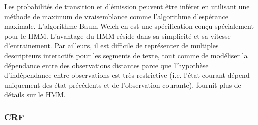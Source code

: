 Les probabilités de transition et d'émission peuvent être inférer en utilisant une méthode de maximum de vraisemblance comme l'algorithme d'espérance maximale. L'algorithme Baum-Welch \citep{welch2003baumwelch} en est une spécification conçu spécialement pour le HMM. L'avantage du HMM réside dans sa simplicité et sa vitesse d'entrainement. Par ailleurs, il est difficile de représenter de multiples descripteurs interactifs pour les segments de texte, tout comme de modéliser la dépendance entre des observations distantes parce que l'hypothèse d'indépendance entre observations est très restrictive (i.e. l'état courant dépend uniquement des état précédents et de l'observation courante). \citet{rabiner1989tutorial} fournit plus de détails sur le HMM.

\subsubsection{CRF}
\label{sec:structuration:biblio:CRF}

